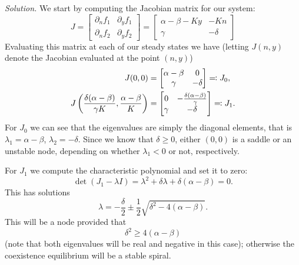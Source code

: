 \documentclass{article}
\begin{document}
\textit{Solution.}
We start by computing the Jacobian matrix for our system:
%
\begin{equation*}
    J =
    \begin{bmatrix}
        \partial_n f_1 & \partial_y f_1 \\
        \partial_n f_2 & \partial_y f_2
    \end{bmatrix}
    =
    \begin{bmatrix}
        \alpha - \beta - K y & - K n \\
        \gamma & - \delta
    \end{bmatrix}
\end{equation*}
%
Evaluating this matrix at each of our steady states we have
(letting $J(n, y)$ denote the Jacobian evaluated at the point
$(n, y)$)
%
\begin{align*}
    J(0, 0) &=
    \begin{bmatrix}
        \alpha - \beta & 0 \\
        \gamma & - \delta
    \end{bmatrix}
    \eqqcolon J_0
    ,
    \\
    J \del{
            \frac{\delta (\alpha - \beta)}{\gamma K},
            \frac{\alpha - \beta}{K}
        }
    &=
    \begin{bmatrix}
        0 & - \frac{\delta (\alpha - \beta)}{\gamma} \\
        \gamma & - \delta
    \end{bmatrix}
    \eqqcolon J_1
    .
\end{align*}
%
For $J_0$ we can see that the eigenvalues are simply the diagonal elements,
that is $\lambda_1 = \alpha - \beta$, $\lambda_2 = - \delta$. Since we
know that $\delta \geq 0$, either $(0, 0)$ is a saddle or an unstable node,
depending on whether $\lambda_1 < 0$ or not, respectively.

For $J_1$ we compute the characteristic polynomial and set it to zero:
%
\begin{equation*}
    \det(J_1 - \lambda I) = \lambda^2 + \delta \lambda + \delta (\alpha - \beta) = 0
    .
\end{equation*}
%
This has solutions
%
\begin{equation*}
    \lambda = - \frac{\delta}{2} \pm \frac{1}{2} \sqrt{\delta^2 - 4(\alpha - \beta)}
    .
\end{equation*}
%
This will be a node provided that
%
\begin{equation*}
    \delta^2 \geq 4 (\alpha - \beta)
\end{equation*}
%
(note that both eigenvalues will be real and negative in this case); otherwise
the coexistence equilibrium will be a stable spiral.
\end{document}
